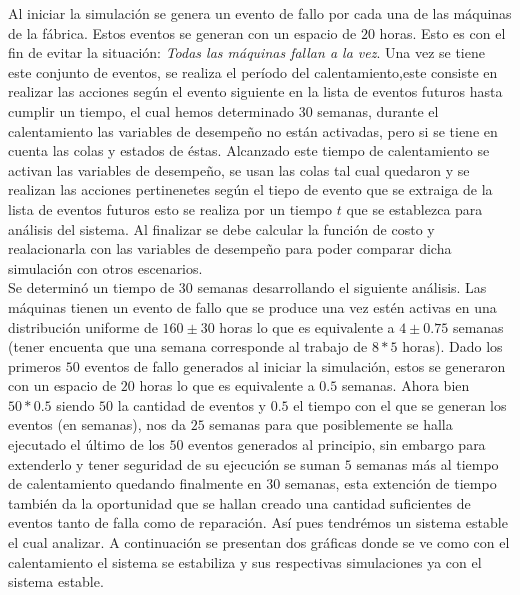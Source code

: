 \documentclass[12pt]{article}
\begin{document}
Al iniciar la simulación se genera un evento de fallo por cada una de las máquinas de la fábrica. Estos eventos se generan con un  espacio de $20$ horas. Esto es con el fin de evitar la situación: \emph{Todas las máquinas fallan a la vez}. Una vez se tiene este conjunto de eventos, se realiza el período del calentamiento,este consiste en realizar las acciones seg\'un el evento siguiente en la lista de eventos futuros hasta cumplir un tiempo, el cual hemos determinado 30 semanas, durante el calentamiento las variables de desempeño no están activadas, pero si se tiene en cuenta las colas y estados de éstas. Alcanzado este tiempo de calentamiento se activan las variables de desempeño, se usan las colas tal cual quedaron y se realizan las acciones pertinenetes seg\'un el tiepo de evento que se extraiga de la lista de eventos futuros esto se realiza por un tiempo $t$ que se establezca para análisis del sistema. Al finalizar se debe calcular la función de costo y realacionarla con las variables de desempeño para poder comparar dicha simulación con otros escenarios.\\

Se determinó un tiempo de 30 semanas desarrollando el siguiente análisis. Las máquinas tienen un evento de fallo que se produce una vez estén activas en una distribución uniforme de $160\pm30$ horas lo que es equivalente a $4\pm0.75$ semanas (tener encuenta que una semana corresponde al trabajo de $8*5$  horas). Dado los primeros $50$ eventos de fallo generados al iniciar la simulación, estos se generaron con un espacio de $20$ horas lo que es equivalente a $0.5$ semanas. Ahora bien $50*0.5$ siendo $50$ la cantidad de eventos y $0.5$ el tiempo con el que se generan los eventos (en semanas), nos da $25$ semanas para que posiblemente se halla ejecutado el último de los $50$ eventos generados al principio, sin embargo para extenderlo y tener seguridad de su ejecución se suman $5$ semanas más al tiempo de calentamiento quedando finalmente en $30$ semanas, esta extención de tiempo también da la oportunidad que se hallan creado una cantidad suficientes de eventos tanto de falla como de reparación. Así pues tendrémos un sistema estable el cual analizar. A continuación se presentan dos gr\'aficas donde se ve como con el calentamiento el sistema se estabiliza y sus respectivas simulaciones ya con el sistema estable.\\

\newpage
\end{document}

